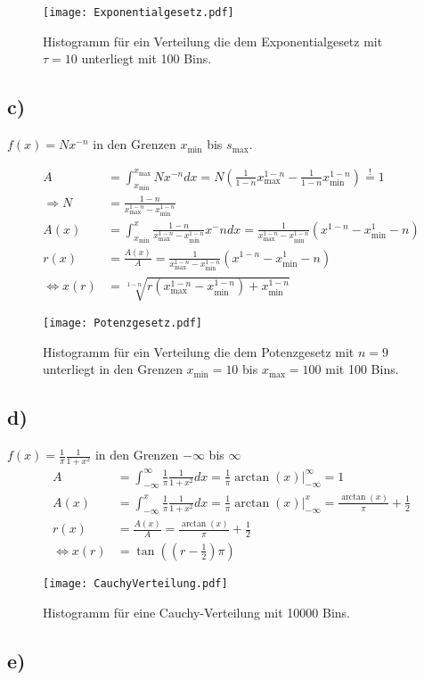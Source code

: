 \begin{figure}
  \centering
  \texttt{[image: Exponentialgesetz.pdf]}
  \caption{Histogramm für ein Verteilung die dem Exponentialgesetz mit $\tau=10$ unterliegt mit 100 Bins.}
  \label{fig:expo}
\end{figure}
\FloatBarrier

\subsection{c)}
\label{subsec:a3c}
$f(x)=Nx^{-n}$ in den Grenzen  $x_\text{min}$ bis $s_\text{max}$.

\begin{align}
A&=\int_{x_\text{min}}^{x_\text{max}} Nx^{-n} dx=
N(\frac{1}{1-n}x_\text{max}^{1-n}-\frac{1}{1-n}x_\text{min}^{1-n})\stackrel{!}{=}1\\
\Rightarrow N&=\frac{1-n}{x_\text{max}^{1-n}-x_\text{min}^{1-n}}\\
A(x)&=\int_{x_\text{min}}^x \frac{1-n}{x_\text{max}^{1-n}-x_\text{min}^{1-n}}x^-n dx=\frac{1}{x_\text{max}^{1-n}-x_\text{min}^{1-n}}\left(x^{1-n}-x_\text{min}^1-n\right)\\
r(x)&=\frac{A(x)}{A}=\frac{1}{x_\text{max}^{1-n}-x_\text{min}^{1-n}}\left(x^{1-n}-x_\text{min}^1-n\right)\\
\iff x(r) &=\sqrt[1-n]{r(x_\text{max}^{1-n}-x_\text{min}^{1-n})+x_\text{min}^{1-n}}
\end{align}


\begin{figure}
  \centering
  \texttt{[image: Potenzgesetz.pdf]}
  \caption{Histogramm für ein Verteilung die dem Potenzgesetz mit $n=9$ unterliegt in den Grenzen $x_\text{min}=10$ bis $x_\text{max}=100$  mit 100 Bins.}
  \label{fig:poten}
\end{figure}
\FloatBarrier



\subsection{d)}
\label{subsec:a3d}
$f(x)=\frac{1}{\pi}\frac{1}{1+x^{2}} $ in den Grenzen $-\infty$ bis $\infty$
\begin{align}
A&=\int_{-\infty}^{\infty} \frac{1}{\pi}\frac{1}{1+x^{2}}dx =\frac{1}{\pi} \arctan(x)\bigr|_{-\infty}^{\infty}=1 \\
A(x)&=\int_{-\infty}^{x} \frac{1}{\pi}\frac{1}{1+x^{2}}dx =\frac{1}{\pi} \arctan(x)\bigr|_{-\infty}^{x}
=\frac{\arctan(x)}{\pi}+\frac{1}{2}\\
r(x)&=\frac{A(x)}{A}=\frac{\arctan(x)}{\pi}+\frac{1}{2}\\
\iff x(r)&=\tan\left(\left(r-\frac{1}{2}\right)\pi\right)
\end{align}

\begin{figure}
  \centering
  \texttt{[image: CauchyVerteilung.pdf]}
  \caption{Histogramm für eine Cauchy-Verteilung mit 10000 Bins.}
  \label{fig:cauchy}
\end{figure}

\subsection{e)}
\label{subsec:a3e}
